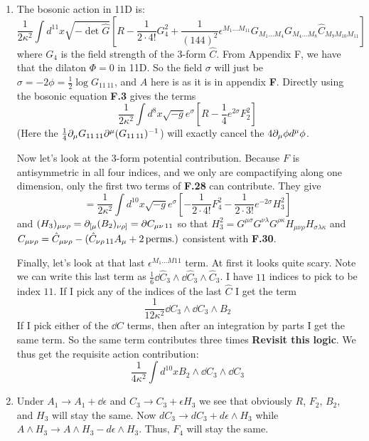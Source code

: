 \documentclass[11pt, class=article, crop=false]{standalone}
\begin{document}
\begin{enumerate}
	\item The bosonic action in 11D is:
	\[
		\frac{1}{2\kappa^2} \int d^{11} x \sqrt{-\det \hat G} \left[R - \frac{1}{2 \cdot 4!} G_4^2 + \frac{1}{(144)^2} \epsilon^{M_1 \dots M_{11}} G_{M_1 \dots M_4} G_{M_4 \dots M_8} \hat C_{M_9 M_{10} M_{11}}\right]
	\]
	where $G_4$ is the field strength of the 3-form $\hat C$. From Appendix F, we have that the dilaton $\Phi = 0$ in 11D. So the field $\sigma$ will just be $\sigma = -2\phi = \frac12 \log G_{11\, 11}$, and $A$ here is as it is in appendix \textbf{F}. Directly using the bosonic equation \textbf{F.3} gives the terms
	\[
		\frac{1}{2\kappa^2 }\int d^8 x \sqrt{-g} e^{\sigma} \left[R - \frac14 e^{2\sigma} F_2^2  \right]
	\]
	(Here the $\frac14 \partial_\mu G_{11\, 11} \partial^\mu (G_{11\, 11})^{-1}$) will exactly cancel the $4 \partial_\mu \phi d^\mu \phi$. 
	
	Now let's look at the $3$-form potential contribution. Because $F$ is antisymmetric in all four indices, and we only are compactifying along one dimension, only the first two terms of \textbf{F.28} can contribute. They give
	\[
		=\frac{1}{2\kappa^2} \int d^{10} x \sqrt{-g} e^\sigma \left[-\frac{1}{2 \cdot 4!} F_4^2 - \frac{1}{2 \cdot 3!} e^{-2\sigma} H_3^2 \right]
	\]
	and $(H_3)_{\mu \nu \rho} = \partial_{[\mu} (B_2)_{\nu \rho]} = \partial C_{\mu \nu\, 11}$ so that $H_3^2 = G^{\mu \sigma} G^{\nu \lambda} G^{\rho \kappa} H_{\mu \nu \rho} H_{\sigma \lambda \kappa}$ and $C_{\mu \nu \rho} = \hat C_{\mu \nu \rho} - (\hat C_{\nu \rho\, 11} A_\mu + 2 \,\mathrm{perms.})$  consistent with \textbf{F.30}.

	Finally, let's look at that last $\epsilon^{M_1 \dots M{11}}$ term. At first it looks quite scary. Note we can write this last term as $\frac16 \dd \hat C_3 \wedge \dd \hat C_3 \wedge \hat C_3$. I have $11$ indices to pick to be index $11$. If I pick any of the indices of the last $\hat C$ I get the term
	\[
		\frac{1}{12 \kappa^2} \dd C_3 \wedge \dd C_3 \wedge B_2
	\]
	If I pick either of the $\dd C$ terms, then after an integration by parts I get the same term. So the same term contributes three times \textbf{Revisit this logic}. We thus get the requisite action contribution:
	\[
		\frac{1}{4\kappa^2} \int d^{10} x B_2 \wedge \dd C_3 \wedge \dd C_3
	\]
	\item Under $A_1 \to A_1 + \dd \epsilon$ and $C_3 \to C_3 + \epsilon H_3$ we see that obviously $R$, $F_2$, $B_2$, and $H_3$ will stay the same. Now $dC_3 \to dC_3 + d\epsilon \wedge H_3$ while $A \wedge H_3 \to A \wedge H_3 - d \epsilon \wedge H_3$. Thus, $F_4$ will stay the same. 
	

\end{enumerate}
\end{document}
